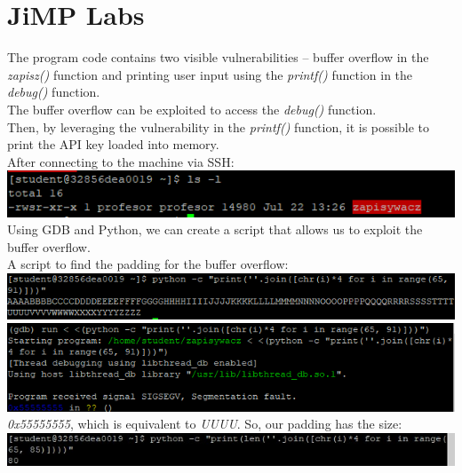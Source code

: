 \documentclass{article}
\begin{document}
\newpage
\section{JiMP Labs}
The program code contains two visible vulnerabilities – buffer overflow in the \textit{zapisz()} function and printing user input using the \textit{printf()} function in the \textit{debug()} function.
\vspace{3mm} \\
The buffer overflow can be exploited to access the \textit{debug()} function.
\vspace{3mm} \\
Then, by leveraging the vulnerability in the \textit{printf()} function, it is possible to print the API key loaded into memory.
\vspace{3mm} \\
After connecting to the machine via SSH:
\vspace{3mm} \\
\includegraphics[width=\textwidth]{"image48.png"}
\vspace{3mm}
Using GDB and Python, we can create a script that allows us to exploit the buffer overflow.
\vspace{3mm} \\
A script to find the padding for the buffer overflow: \vspace{3mm} \\
\includegraphics[width=\textwidth]{"image49.png"}
\vspace{3mm}
\includegraphics[width=\textwidth]{"image50.png"}
\vspace{3mm}
\textit{0x55555555}, which is equivalent to \textit{UUUU}. So, our padding has the size: \\
\includegraphics[width=\textwidth]{"image51.jpeg"}
\end{document}
